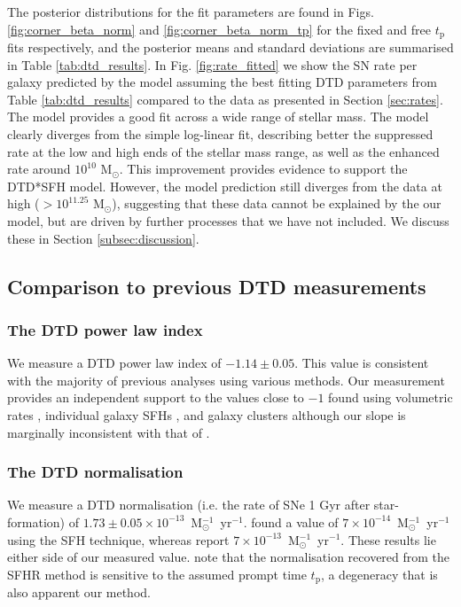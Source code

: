 \documentclass[fleqn,usenatbib]{mnras}
\begin{document}
The posterior distributions for the fit parameters are found in Figs. \ref{fig:corner_beta_norm} and \ref{fig:corner_beta_norm_tp} for the fixed and free $t_{\mathrm{p}}$ fits respectively, and the posterior means and standard deviations are summarised in Table \ref{tab:dtd_results}. In Fig. \ref{fig:rate_fitted} we show the SN rate per galaxy predicted by the model assuming the best fitting DTD parameters from Table \ref{tab:dtd_results} compared to the data as presented in Section \ref{sec:rates}. The model provides a good fit across a wide range of stellar mass. The model clearly diverges from the simple log-linear fit, describing better the suppressed rate at the low and high ends of the stellar mass range, as well as the enhanced rate around $10^{10}$ M$_{\odot}$. This improvement provides evidence to support the DTD*SFH model. However, the model prediction still diverges from the data at high ($>10^{11.25}$ M$_{\odot}$), suggesting that these data cannot be explained by the our model, but are driven by further processes that we have not included. We discuss these in Section \ref{subsec:discussion}.

\subsection{Comparison to previous DTD measurements \label{subsec:compare_dtd}}

\subsubsection{The DTD power law index \label{subsubsec:compare_beta}}
We measure a DTD power law index of $-1.14\pm0.05$. This value is consistent with the majority of previous analyses using various methods. Our measurement provides an independent support to the values close to $-1$ found using volumetric rates \citep[e.g.][]{Graur2013,Frohmaier2019}, individual galaxy SFHs \citep[e.g.][]{Maoz2012,Graur2013}, and galaxy clusters \citep[e.g.][]{Maoz2010} although our slope is marginally inconsistent with that of \citet{Heringer2019}. 

\subsubsection{The DTD normalisation \label{subsubsec:compare_A}}
We measure a DTD normalisation (i.e. the rate of SNe 1 Gyr after star-formation) of $1.73 \pm 0.05 \times 10^{-13}$~M$_{\odot}^{-1}$~yr$^{-1}$. \citet{Graur2013} found a value of $7 \times 10^{-14}$~M$_{\odot}^{-1}$~yr$^{-1}$ using the SFH technique, whereas \citet{Heringer2019} report $7 \times 10^{-13}$~M$_{\odot}^{-1}$~yr$^{-1}$. These results lie either side of our measured value. \citet{Heringer2019} note that the normalisation recovered from the SFHR method is sensitive to the assumed prompt time $t_{\mathrm{p}}$, a degeneracy that is also apparent our method. 
\end{document}
